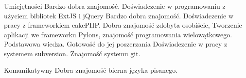 \begin{rubric}{Umiejętności}
\entry*[JavaScript]
	Bardzo dobra znajomość. Doświadczenie w programowaniu z użyciem
	bibliotek ExtJS i jQuery
\entry*[PHP]
	Bardzo dobra znajomość. Doświadczenie w pracy z frameworkiem cakePHP.
\entry*[Python]
	Dobra znajomość zdobyta osobiście, Tworzenie aplikacji we frameworku Pylons, 
	znajomość programowania wielowątkowego.
\entry*[Java, C, C++]
	Podstawowa wiedza. Gotowość do jej poszerzania
	Doświadczenie w pracy z systemem subversion. Znajomość systemu git.

\entry*[Angielski]
	Komunikatywny
\entry*[Rosyjski]
	Dobra znajomość bierna języka pisanego.
\end{rubric}
